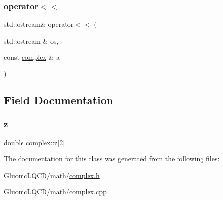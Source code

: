 \subsubsection{\texorpdfstring{operator$<$$<$}{operator<<}}
{\footnotesize\ttfamily std\+::ostream\& operator$<$$<$ (\begin{DoxyParamCaption}\item[{std\+::ostream \&}]{os,  }\item[{const \mbox{\hyperlink{classcomplex}{complex}} \&}]{a }\end{DoxyParamCaption})\hspace{0.3cm}{\ttfamily [friend]}}



\subsection{Field Documentation}
\mbox{\label{classcomplex_a24187dbb902b927fe283d138188ec6fe}} 
\subsubsection{\texorpdfstring{z}{z}}
{\footnotesize\ttfamily double complex\+::z\mbox{[}2\mbox{]}}



The documentation for this class was generated from the following files\+:\begin{DoxyCompactItemize}
\item 
Gluonic\+L\+Q\+C\+D/math/\mbox{\hyperlink{complex_8h}{complex.\+h}}\item 
Gluonic\+L\+Q\+C\+D/math/\mbox{\hyperlink{complex_8cpp}{complex.\+cpp}}\end{DoxyCompactItemize}
